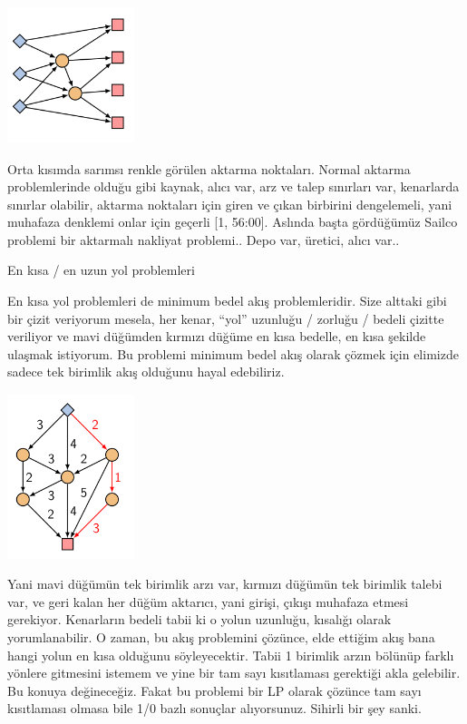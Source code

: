 \documentclass[12pt,fleqn]{article}\usepackage{../../common}
\begin{document}
\includegraphics[width=10em]{func_90_nflow_08.png}

Orta kısımda sarımsı renkle görülen aktarma noktaları. Normal aktarma
problemlerinde olduğu gibi kaynak, alıcı var, arz ve talep sınırları var,
kenarlarda sınırlar olabilir, aktarma noktaları için giren ve çıkan
birbirini dengelemeli, yani muhafaza denklemi onlar için geçerli [1,
56:00]. Aslında başta gördüğümüz Sailco problemi bir aktarmalı nakliyat
problemi.. Depo var, üretici, alıcı var..

En kısa / en uzun yol problemleri

En kısa yol problemleri de minimum bedel akış problemleridir. Size alttaki
gibi bir çizit veriyorum mesela, her kenar, ``yol'' uzunluğu / zorluğu /
bedeli çizitte veriliyor ve mavi düğümden kırmızı düğüme en kısa bedelle,
en kısa şekilde ulaşmak istiyorum. Bu problemi minimum bedel akış olarak
çözmek için elimizde sadece tek birimlik akış olduğunu hayal
edebiliriz. 

\includegraphics[width=10em]{func_90_nflow_09.png}

Yani mavi düğümün tek birimlik arzı var, kırmızı düğümün tek birimlik
talebi var, ve geri kalan her düğüm aktarıcı, yani girişi, çıkışı muhafaza
etmesi gerekiyor. Kenarların bedeli tabii ki o yolun uzunluğu, kısalığı
olarak yorumlanabilir. O zaman, bu akış problemini çözünce, elde ettiğim
akış bana hangi yolun en kısa olduğunu söyleyecektir. Tabii 1 birimlik
arzın bölünüp farklı yönlere gitmesini istemem ve yine bir tam sayı
kısıtlaması gerektiği akla gelebilir. Bu konuya değineceğiz. Fakat bu
problemi bir LP olarak çözünce tam sayı kısıtlaması olmasa bile 1/0 bazlı
sonuçlar alıyorsunuz. Sihirli bir şey sanki.
\end{document}
